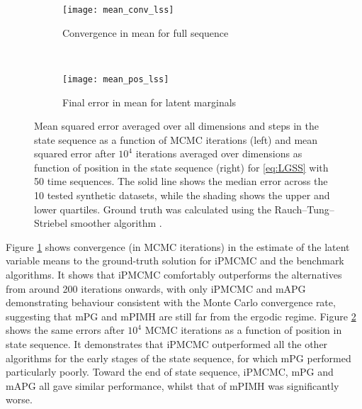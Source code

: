 \begin{figure*}[t]
	\centering
	\begin{subfigure}[t]{0.49\textwidth}
		\texttt{[image: mean\_conv\_lss]}
		\caption{Convergence in mean for full sequence}
		\label{fig:meanConv}
	\end{subfigure}
	~  %
	\begin{subfigure}[t]{0.49\textwidth}
		\texttt{[image: mean\_pos\_lss]}
		\caption{Final error in mean for latent marginals}
		\label{fig:meanPos}
	\end{subfigure}
	
	\vspace{5pt}
	\caption{Mean squared error averaged over all dimensions and steps in the state sequence as a function of MCMC iterations (left) and mean squared error after $10^4$ iterations averaged over dimensions as function of position in the state sequence (right) for \eqref{eq:LGSS} with 50 time sequences.  The solid line shows the median error across the 10 tested synthetic datasets, while the shading shows the upper and lower quartiles.  Ground truth was calculated using the Rauch--Tung--Striebel smoother algorithm \cite{rauch1965maximum}. 
		\label{fig:groundTruth}}
\end{figure*}

Figure \ref{fig:meanConv} shows convergence (in MCMC iterations) in the estimate of the latent variable means to the ground-truth solution for iPMCMC and the benchmark algorithms.  It shows that iPMCMC comfortably outperforms the alternatives from around 200 iterations onwards, with only iPMCMC and mAPG demonstrating behaviour consistent with the Monte Carlo convergence rate, suggesting that mPG and mPIMH are still far from the ergodic regime.  Figure \ref{fig:meanPos} shows the same errors after $10^4$ MCMC iterations as a function of position in state sequence.  It demonstrates that iPMCMC outperformed all the other algorithms for the early stages of the state sequence, for which mPG performed particularly poorly. Toward the end of state sequence, iPMCMC, mPG and mAPG all gave similar performance, whilst that of mPIMH was significantly worse.

